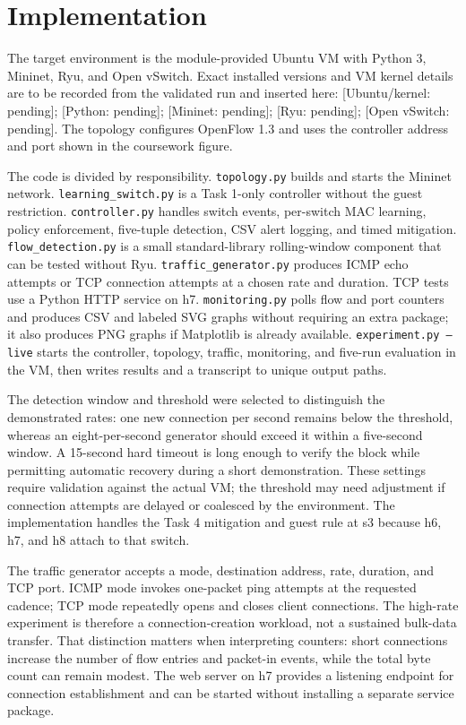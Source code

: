 \section{Implementation}

The target environment is the module-provided Ubuntu VM with Python 3, Mininet, Ryu, and Open vSwitch. Exact installed versions and VM kernel details are to be recorded from the validated run and inserted here: [Ubuntu/kernel: pending]; [Python: pending]; [Mininet: pending]; [Ryu: pending]; [Open vSwitch: pending]. The topology configures OpenFlow 1.3 and uses the controller address and port shown in the coursework figure.

The code is divided by responsibility. \texttt{topology.py} builds and starts the Mininet network. \texttt{learning\_switch.py} is a Task 1-only controller without the guest restriction. \texttt{controller.py} handles switch events, per-switch MAC learning, policy enforcement, five-tuple detection, CSV alert logging, and timed mitigation. \texttt{flow\_detection.py} is a small standard-library rolling-window component that can be tested without Ryu. \texttt{traffic\_generator.py} produces ICMP echo attempts or TCP connection attempts at a chosen rate and duration. TCP tests use a Python HTTP service on h7. \texttt{monitoring.py} polls flow and port counters and produces CSV and labeled SVG graphs without requiring an extra package; it also produces PNG graphs if Matplotlib is already available. \texttt{experiment.py --live} starts the controller, topology, traffic, monitoring, and five-run evaluation in the VM, then writes results and a transcript to unique output paths.

The detection window and threshold were selected to distinguish the demonstrated rates: one new connection per second remains below the threshold, whereas an eight-per-second generator should exceed it within a five-second window. A 15-second hard timeout is long enough to verify the block while permitting automatic recovery during a short demonstration. These settings require validation against the actual VM; the threshold may need adjustment if connection attempts are delayed or coalesced by the environment. The implementation handles the Task 4 mitigation and guest rule at s3 because h6, h7, and h8 attach to that switch.

The traffic generator accepts a mode, destination address, rate, duration, and TCP port. ICMP mode invokes one-packet ping attempts at the requested cadence; TCP mode repeatedly opens and closes client connections. The high-rate experiment is therefore a connection-creation workload, not a sustained bulk-data transfer. That distinction matters when interpreting counters: short connections increase the number of flow entries and packet-in events, while the total byte count can remain modest. The web server on h7 provides a listening endpoint for connection establishment and can be started without installing a separate service package.

